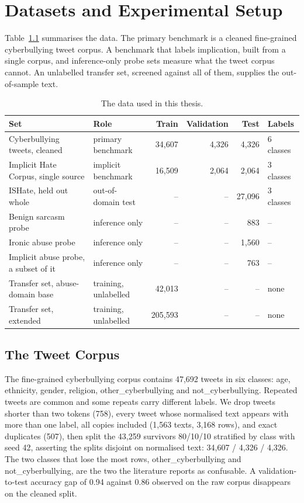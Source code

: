 \chapter{Datasets and Experimental Setup}
\label{ch:4}
Table~\ref{tab:data} summarises the data. The primary benchmark is a cleaned fine-grained
cyberbullying tweet corpus. A benchmark that labels implication, built from a single corpus, and
inference-only probe sets measure what the tweet corpus cannot. An unlabelled transfer set, screened
against all of them, supplies the out-of-sample text.

\begin{table}[htbp]
\centering
\small
\caption{The data used in this thesis.}
\label{tab:data}
\begin{tabular}{p{5.4cm}p{2.6cm}rrrp{1.5cm}}
\toprule
Set & Role & Train & Validation & Test & Labels \\
\midrule
Cyberbullying tweets, cleaned \cite{wang2020sosnet} & primary benchmark & 34,607 & 4,326 & 4,326 & 6 classes \\
Implicit Hate Corpus, single source \cite{elsherief2021latent} & implicit benchmark & 16,509 & 2,064 & 2,064 & 3 classes \\
ISHate, held out whole \cite{ocampo2023indepth} & out-of-domain test & -- & -- & 27,096 & 3 classes \\
Benign sarcasm probe \cite{abufarha2022semeval, oprea2020isarcasm} & inference only & -- & -- & 883 & -- \\
Ironic abuse probe \cite{elsherief2021latent, ocampo2023indepth} & inference only & -- & -- & 1,560 & -- \\
Implicit abuse probe, a subset of it \cite{ocampo2023indepth} & inference only & -- & -- & 763 & -- \\
Transfer set, abuse-domain base \cite{davidson2017automated, zampieri2019olid, basile2019hateval} & training, unlabelled & 42,013 & -- & -- & none \\
Transfer set, extended \cite{barbieri2020tweeteval} & training, unlabelled & 205,593 & -- & -- & none \\
\bottomrule
\end{tabular}
\end{table}

\section{The Tweet Corpus}
\label{sec:4.1}
The fine-grained cyberbullying corpus \cite{wang2020sosnet} contains 47,692 tweets in six classes:
age, ethnicity, gender, religion, other\_cyberbullying and not\_cyberbullying. Repeated tweets are
common and some repeats carry different labels. We drop tweets shorter than two tokens (758), every
tweet whose normalised text appears with more than one label, all copies included (1,563 texts,
3,168 rows), and exact duplicates (507), then split the 43,259 survivors 80/10/10 stratified by
class with seed 42, asserting the splits disjoint on normalised text: 34,607 / 4,326 / 4,326. The
two classes that lose the most rows, other\_cyberbullying and not\_cyberbullying, are the two the
literature reports as confusable. A validation-to-test accuracy gap of 0.94 against 0.86 observed on
the raw corpus disappears on the cleaned split.

